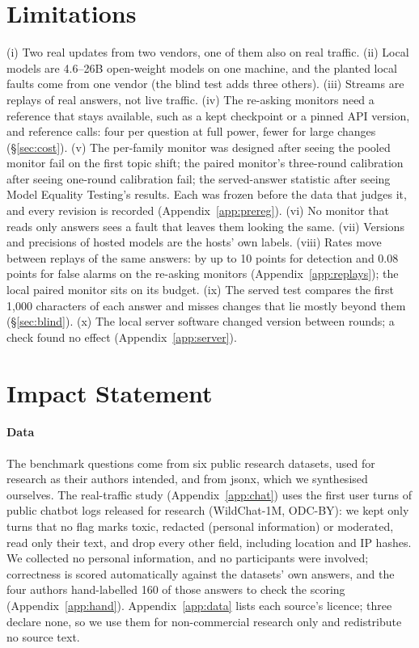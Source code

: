 \documentclass{article}
\begin{document}
\section*{Limitations}
(i) Two real updates from two vendors, one of them also on real traffic. (ii) Local models are 4.6--26B open-weight models on one
machine, and the planted local faults come from one vendor (the blind test adds
three others). (iii) Streams are replays of
real answers, not live traffic. (iv) The re-asking monitors need a reference that
stays available, such as a kept checkpoint or a pinned API version, and reference
calls: four per question at full power, fewer for large changes (\S\ref{sec:cost}). (v) The per-family monitor was designed
after seeing the pooled monitor fail on the first topic shift; the paired monitor's
three-round calibration after seeing one-round calibration fail; the served-answer
statistic after seeing Model Equality Testing's results. Each was frozen before the
data that judges it, and every revision is recorded (Appendix~\ref{app:prereg}).
(vi) No monitor that reads only answers sees a fault that leaves them looking the
same. (vii) Versions and precisions of hosted models are the hosts' own labels.
(viii) Rates move between replays of the same answers: by up to 10 points for
detection and 0.08 points for false alarms on the re-asking monitors
(Appendix~\ref{app:replays}); the local paired monitor sits on its budget.
(ix) The served test compares the first 1{,}000 characters of each answer and
misses changes that lie mostly beyond them (\S\ref{sec:blind}). (x) The local server software
changed version between rounds; a check found no effect (Appendix~\ref{app:server}).

\section*{Impact Statement}
\paragraph{Data} The benchmark questions come from six public research datasets,
used for research as their authors intended, and from \textsf{jsonx}, which we
synthesised ourselves. The real-traffic study (Appendix~\ref{app:chat}) uses the
first user turns of public chatbot logs released for research (WildChat-1M,
ODC-BY): we kept only turns that no flag marks toxic, redacted (personal
information) or moderated, read only their text, and drop every other field,
including location and IP hashes. We collected no personal information, and no
participants were involved; correctness is scored automatically against the
datasets' own answers, and the four authors hand-labelled 160 of those answers to
check the scoring (Appendix~\ref{app:hand}). Appendix~\ref{app:data} lists each source's licence; three declare none, so we use them for non-commercial research only and redistribute no source text.
\end{document}
